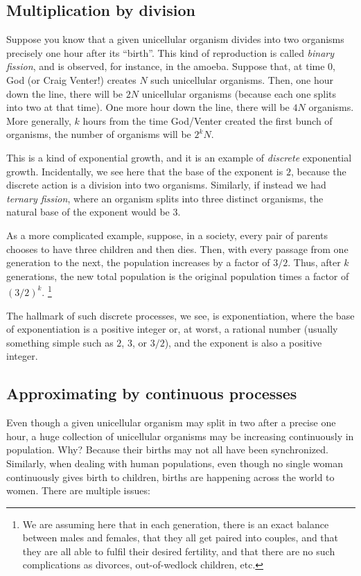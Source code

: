 \documentclass{amsart}
\begin{document}
\subsection{Multiplication by division}

Suppose you know that a given unicellular organism divides into two
organisms precisely one hour after its ``birth''. This kind of
reproduction is called {\em binary fission}, and is observed, for
instance, in the amoeba. Suppose that, at time $0$, God (or Craig
Venter!) creates $N$ such unicellular organisms. Then, one hour down
the line, there will be $2N$ unicellular organisms (because each one
splits into two at that time). One more hour down the line, there will
be $4N$ organisms. More generally, $k$ hours from the time God/Venter
created the first bunch of organisms, the number of organisms will be
$2^kN$.

This is a kind of exponential growth, and it is an example of {\em
discrete} exponential growth. Incidentally, we see here that the base
of the exponent is $2$, because the discrete action is a division into
two organisms. Similarly, if instead we had {\em ternary fission},
where an organism splits into three distinct organisms, the natural
base of the exponent would be $3$.

As a more complicated example, suppose, in a society, every pair of
parents chooses to have three children and then dies. Then, with every
passage from one generation to the next, the population increases by a
factor of $3/2$. Thus, after $k$ generations, the new total population
is the original population times a factor of $(3/2)^k$. \footnote{We
are assuming here that in each generation, there is an exact balance
between males and females, that they all get paired into couples, and
that they are all able to fulfil their desired fertility, and that
there are no such complications as divorces, out-of-wedlock children, etc.}

The hallmark of such discrete processes, we see, is exponentiation,
where the base of exponentiation is a positive integer or, at worst, a
rational number (usually something simple such as $2$, $3$, or $3/2$),
and the exponent is also a positive integer.

\subsection{Approximating by continuous processes}

Even though a given unicellular organism may split in two after a
precise one hour, a huge collection of unicellular organisms may be
increasing continuously in population. Why? Because their births may
not all have been synchronized. Similarly, when dealing with human
populations, even though no single woman continuously gives birth to
children, births are happening across the world to women. There are
multiple issues:
\end{document}
